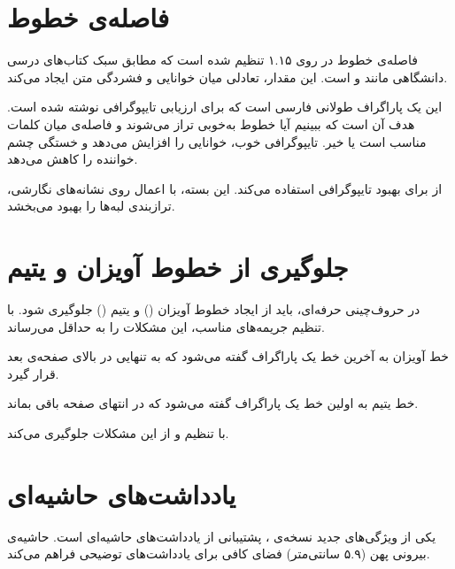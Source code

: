 \documentclass{matinbook}
\begin{document}
\section{فاصله‌ی خطوط}
\label{sec:typography-leading}

فاصله‌ی خطوط در  روی ۱.۱۵ تنظیم شده است که
مطابق سبک کتاب‌های درسی دانشگاهی مانند  و
 است. این مقدار، تعادلی میان خوانایی و
فشردگی متن ایجاد می‌کند.

این یک پاراگراف طولانی فارسی است که برای ارزیابی
تایپوگرافی نوشته شده است. هدف آن است که ببینیم آیا
خطوط به‌خوبی تراز می‌شوند و فاصله‌ی میان کلمات مناسب
است یا خیر. تایپوگرافی خوب، خوانایی را افزایش می‌دهد
و خستگی چشم خواننده را کاهش می‌دهد.

 از  برای بهبود تایپوگرافی
استفاده می‌کند. این بسته، با اعمال  روی
نشانه‌های نگارشی، ترازبندی لبه‌ها را بهبود می‌بخشد.

\section{جلوگیری از خطوط آویزان و یتیم}
\label{sec:typography-widow}

در حروف‌چینی حرفه‌ای، باید از ایجاد خطوط آویزان ()
و یتیم () جلوگیری شود.  با تنظیم
جریمه‌های مناسب، این مشکلات را به حداقل می‌رساند.

\begin{definition}[خط آویزان]
    خط آویزان به آخرین خط یک پاراگراف گفته می‌شود که به
    تنهایی در بالای صفحه‌ی بعد قرار گیرد.
    \label{def:widow}
\end{definition}

\begin{definition}[خط یتیم]
    خط یتیم به اولین خط یک پاراگراف گفته می‌شود که
    در انتهای صفحه باقی بماند.
    \label{def:orphan}
\end{definition}

 با تنظیم 
و  از این مشکلات
جلوگیری می‌کند.

\section{یادداشت‌های حاشیه‌ای}
\label{sec:typography-margin}

یکی از ویژگی‌های جدید  نسخه‌ی \lr{\matinbookversion}،
پشتیبانی از یادداشت‌های حاشیه‌ای است. حاشیه‌ی بیرونی پهن
(۵.۹ سانتی‌متر) فضای کافی برای یادداشت‌های توضیحی فراهم می‌کند.
\end{document}
